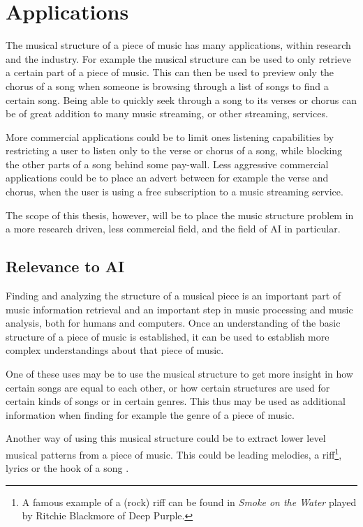 \section{Applications}
The musical structure of a piece of music has many applications, within research and the industry. For example the musical structure can be used to only retrieve a certain part of a piece of music. This can then be used to preview only the chorus of a song when someone is browsing through a list of songs to find a certain song. Being able to quickly seek through a song to its verses or chorus can be of great addition to many music streaming, or other streaming, services. 

More commercial applications could be to limit ones listening capabilities by restricting a user to listen only to the verse or chorus of a song, while blocking the other parts of a song behind some pay-wall. Less aggressive commercial applications could be to place an advert between for example the verse and chorus, when the user is using a free subscription to a music streaming service.

The scope of this thesis, however, will be to place the music structure problem in a more research driven, less commercial field, and the field of AI in particular.

\subsection{Relevance to AI}
Finding and analyzing the structure of a musical piece is an important part of music information retrieval and an important step in music processing and music analysis, both for humans and computers. Once an understanding of the basic structure of a piece of music is established, it can be used to establish more complex understandings about that piece of music.

One of these uses may be to use the musical structure to get more insight in how certain songs are equal to each other, or how certain structures are used for certain kinds of songs or in certain genres. This thus may be used as additional information when finding for example the genre of a piece of music.

Another way of using this musical structure could be to extract lower level musical patterns from a piece of music. This could be leading melodies, a riff\footnote{A famous example of a (rock) riff can be found in \textit{Smoke on the Water} played by Ritchie Blackmore of Deep Purple.}, lyrics or the hook \cite{Covach2005form} of a song \cite{Chai2005automated}.

